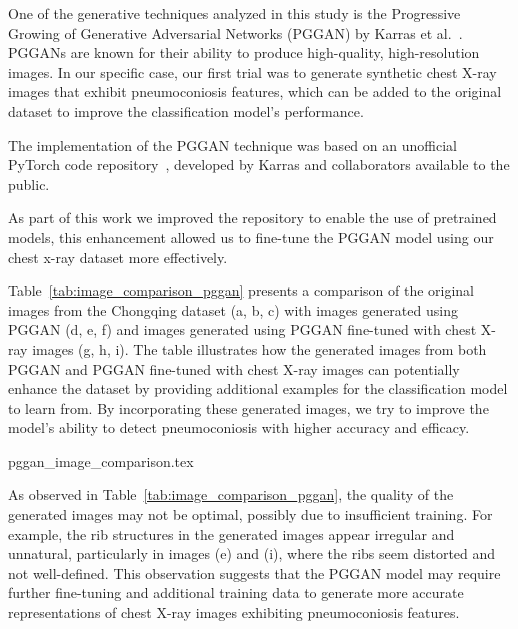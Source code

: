 One of the generative techniques analyzed in this study is the Progressive Growing of Generative Adversarial Networks (PGGAN) by Karras et al.~\cite{karras_pggan}. PGGANs are known for their ability to produce high-quality, high-resolution images. In our specific case, our first trial was to generate synthetic chest X-ray images that exhibit pneumoconiosis features, which can be added to the original dataset to improve the classification model's performance.

The implementation of the PGGAN technique was based on an unofficial PyTorch code repository~\cite{proganpytorch}, developed by Karras and collaborators available to the public.

As part of this work we improved the repository to enable the use of pretrained models, this enhancement allowed us to fine-tune the PGGAN model using our chest x-ray dataset more effectively. 

Table~\ref{tab:image_comparison_pggan} presents a comparison of the original images from the Chongqing dataset (a, b, c) with images generated using PGGAN (d, e, f) and images generated using PGGAN fine-tuned with chest X-ray images (g, h, i). The table illustrates how the generated images from both PGGAN and PGGAN fine-tuned with chest X-ray images can potentially enhance the dataset by providing additional examples for the classification model to learn from. By incorporating these generated images, we try to improve the model's ability to detect pneumoconiosis with higher accuracy and efficacy.

{pggan_image_comparison.tex}

As observed in Table~\ref{tab:image_comparison_pggan}, the quality of the generated images may not be optimal, possibly due to insufficient training. For example, the rib structures in the generated images appear irregular and unnatural, particularly in images (e) and (i), where the ribs seem distorted and not well-defined. This observation suggests that the PGGAN model may require further fine-tuning and additional training data to generate more accurate representations of chest X-ray images exhibiting pneumoconiosis features.

